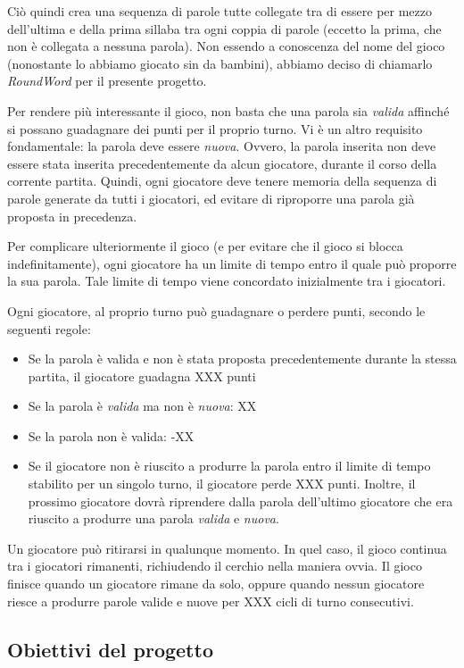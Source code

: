 \documentclass[10.5pt]{article}
\begin{document}
Ciò quindi crea una sequenza di parole tutte collegate tra di essere per mezzo dell'ultima e della prima sillaba tra ogni coppia di parole (eccetto la prima, che non è collegata a nessuna parola). Non essendo a conoscenza del nome del gioco (nonostante lo abbiamo giocato sin da bambini), abbiamo deciso di chiamarlo \emph{RoundWord} per il presente progetto.

Per rendere più interessante il gioco, non basta che una parola sia \emph{valida} affinché si possano guadagnare dei punti per il proprio turno. Vi è un altro requisito fondamentale: la parola deve essere \emph{nuova}. Ovvero, la parola inserita non deve essere stata inserita precedentemente da alcun giocatore, durante il corso della corrente partita. Quindi, ogni giocatore deve tenere memoria della sequenza di parole generate da tutti i giocatori, ed evitare di riproporre una parola già proposta in precedenza.

Per complicare ulteriormente il gioco (e per evitare che il gioco si blocca indefinitamente), ogni giocatore ha un limite di tempo entro il quale può proporre la sua parola. Tale limite di tempo viene concordato inizialmente tra i giocatori.

Ogni giocatore, al proprio turno può guadagnare o perdere punti, secondo le seguenti regole:
\begin{itemize}
\item Se la parola è valida e non è stata proposta precedentemente durante la stessa partita, il giocatore guadagna XXX punti
\item Se la parola è \emph{valida} ma non è \emph{nuova}: XX
\item Se la parola non è valida: -XX
\item Se il giocatore non è riuscito a produrre la parola entro il limite di tempo stabilito per un singolo turno, il giocatore perde XXX punti. Inoltre, il prossimo giocatore dovrà riprendere dalla parola dell'ultimo giocatore che era riuscito a produrre una parola \emph{valida} e \emph{nuova}.
\end{itemize}

Un giocatore può ritirarsi in qualunque momento. In quel caso, il gioco continua tra i giocatori rimanenti, richiudendo il cerchio nella maniera ovvia. Il gioco finisce quando un giocatore rimane da solo, oppure quando nessun giocatore riesce a produrre parole valide e nuove per XXX cicli di turno consecutivi.

\subsection{Obiettivi del progetto}
\end{document}
